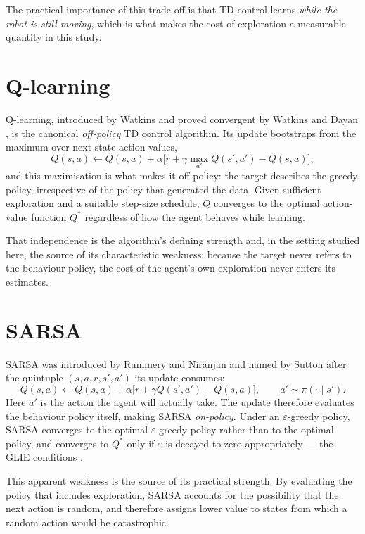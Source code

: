 The practical importance of this trade-off is that TD control learns \emph{while the robot is
still moving}, which is what makes the cost of exploration a measurable quantity in this study.

\section{Q-learning}

Q-learning, introduced by Watkins \cite{watkins1989} and proved convergent by Watkins and Dayan
\cite{watkins1992}, is the canonical \emph{off-policy} TD control algorithm. Its update
bootstraps from the maximum over next-state action values,
\[
Q(s,a) \leftarrow Q(s,a) + \alpha\Big[r + \gamma \max_{a'} Q(s',a') - Q(s,a)\Big],
\]
and this maximisation is what makes it off-policy: the target describes the greedy policy,
irrespective of the policy that generated the data. Given sufficient exploration and a suitable
step-size schedule, $Q$ converges to the optimal action-value function $Q^{*}$ regardless of how
the agent behaves while learning.

That independence is the algorithm's defining strength and, in the setting studied here, the source
of its characteristic weakness: because the target never refers to the behaviour policy, the cost
of the agent's own exploration never enters its estimates.

\section{SARSA}

SARSA was introduced by Rummery and Niranjan \cite{rummery1994} and named by Sutton
\cite{sutton1996} after the quintuple $(s,a,r,s',a')$ its update consumes:
\[
Q(s,a) \leftarrow Q(s,a) + \alpha\Big[r + \gamma Q(s',a') - Q(s,a)\Big],
\qquad a' \sim \pi(\cdot \mid s').
\]
Here $a'$ is the action the agent will actually take. The update therefore evaluates the behaviour
policy itself, making SARSA \emph{on-policy}. Under an $\varepsilon$-greedy policy, SARSA converges
to the optimal $\varepsilon$-greedy policy rather than to the optimal policy, and converges to
$Q^{*}$ only if $\varepsilon$ is decayed to zero appropriately --- the GLIE conditions
\cite{singh2000}.

This apparent weakness is the source of its practical strength. By evaluating the policy that
includes exploration, SARSA accounts for the possibility that the next action is random, and
therefore assigns lower value to states from which a random action would be catastrophic.

